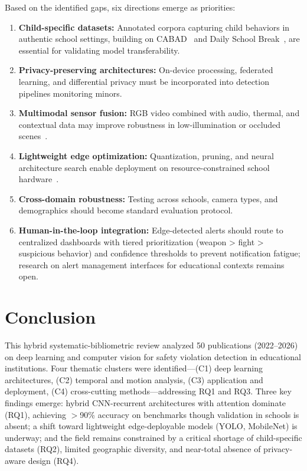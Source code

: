 \documentclass[conference]{IEEEtran}
\begin{document}
Based on the identified gaps, six directions emerge as priorities:
\begin{enumerate}
\item \textbf{Child-specific datasets:} Annotated corpora capturing child behaviors in authentic school settings, building on CABAD~\cite{b15} and Daily School Break~\cite{b11}, are essential for validating model transferability.
\item \textbf{Privacy-preserving architectures:} On-device processing, federated learning, and differential privacy must be incorporated into detection pipelines monitoring minors.
\item \textbf{Multimodal sensor fusion:} RGB video combined with audio, thermal, and contextual data may improve robustness in low-illumination or occluded scenes~\cite{b21,b22}.
\item \textbf{Lightweight edge optimization:} Quantization, pruning, and neural architecture search enable deployment on resource-constrained school hardware~\cite{b7,b23}.
\item \textbf{Cross-domain robustness:} Testing across schools, camera types, and demographics should become standard evaluation protocol.
\item \textbf{Human-in-the-loop integration:} Edge-detected alerts should route to centralized dashboards with tiered prioritization (weapon > fight > suspicious behavior) and confidence thresholds to prevent notification fatigue; research on alert management interfaces for educational contexts remains open.
\end{enumerate}

\section{Conclusion}

This hybrid systematic-bibliometric review analyzed 50 publications (2022--2026) on deep learning and computer vision for safety violation detection in educational institutions. Four thematic clusters were identified---(C1) deep learning architectures, (C2) temporal and motion analysis, (C3) application and deployment, (C4) cross-cutting methods---addressing RQ1 and RQ3. Three key findings emerge: hybrid CNN-recurrent architectures with attention dominate (RQ1), achieving $>$90\% accuracy on benchmarks though validation in schools is absent; a shift toward lightweight edge-deployable models (YOLO, MobileNet) is underway; and the field remains constrained by a critical shortage of child-specific datasets (RQ2), limited geographic diversity, and near-total absence of privacy-aware design (RQ4).
\end{document}
